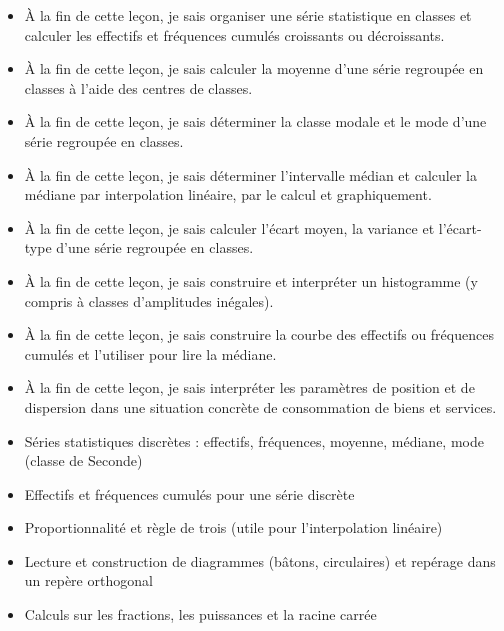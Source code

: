 \documentclass[11pt]{article}
\begin{document}
\begin{objectifs}
\begin{itemize}
\item À la fin de cette leçon, je sais organiser une série statistique en classes et calculer les effectifs et fréquences cumulés croissants ou décroissants.
\item À la fin de cette leçon, je sais calculer la moyenne d'une série regroupée en classes à l'aide des centres de classes.
\item À la fin de cette leçon, je sais déterminer la classe modale et le mode d'une série regroupée en classes.
\item À la fin de cette leçon, je sais déterminer l'intervalle médian et calculer la médiane par interpolation linéaire, par le calcul et graphiquement.
\item À la fin de cette leçon, je sais calculer l'écart moyen, la variance et l'écart-type d'une série regroupée en classes.
\item À la fin de cette leçon, je sais construire et interpréter un histogramme (y compris à classes d'amplitudes inégales).
\item À la fin de cette leçon, je sais construire la courbe des effectifs ou fréquences cumulés et l'utiliser pour lire la médiane.
\item À la fin de cette leçon, je sais interpréter les paramètres de position et de dispersion dans une situation concrète de consommation de biens et services.
\end{itemize}
\end{objectifs}

\begin{prerequis}
\begin{itemize}
\item Séries statistiques discrètes : effectifs, fréquences, moyenne, médiane, mode (classe de Seconde)
\item Effectifs et fréquences cumulés pour une série discrète
\item Proportionnalité et règle de trois (utile pour l'interpolation linéaire)
\item Lecture et construction de diagrammes (bâtons, circulaires) et repérage dans un repère orthogonal
\item Calculs sur les fractions, les puissances et la racine carrée
\end{itemize}
\end{prerequis}

\newpage
\end{document}
